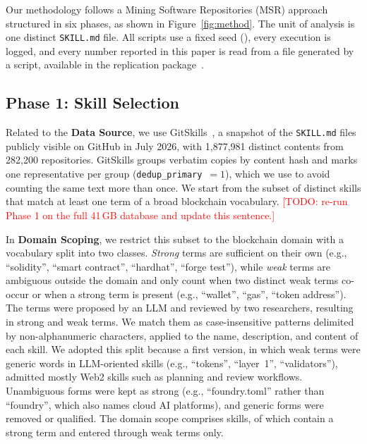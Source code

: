 \documentclass[10pt,conference]{IEEEtran}
\newcommand{\todo}[1]{\textcolor{red}{[TODO: #1]}}
\begin{document}
Our methodology follows a Mining Software Repositories (MSR) approach structured in six phases, as shown in Figure~\ref{fig:method}. The unit of analysis is one distinct \texttt{SKILL.md} file. All scripts use a fixed seed (\Seed), every execution is logged, and every number reported in this paper is read from a file generated by a script, available in the replication package~\cite{replication}.



\subsection{Phase 1: Skill Selection}
\label{sec:selection}

Related to the \textbf{Data Source}, we use GitSkills~\cite{gitskills2027}, a snapshot of the \texttt{SKILL.md} files publicly visible on GitHub in July 2026, with 1,877,981 distinct contents from 282,200 repositories. GitSkills groups verbatim copies by content hash and marks one representative per group (\texttt{dedup\_primary}~$=1$), which we use to avoid counting the same text more than once. We start from the subset of \NScanned distinct skills that match at least one term of a broad blockchain vocabulary. \todo{re-run Phase 1 on the full 41\,GB database and update this sentence.}

In \textbf{Domain Scoping}, we restrict this subset to the blockchain domain with a vocabulary split into two classes. \textit{Strong} terms are sufficient on their own (e.g., ``solidity'', ``smart contract'', ``hardhat'', ``forge test''), while \textit{weak} terms are ambiguous outside the domain and only count when two distinct weak terms co-occur or when a strong term is present (e.g., ``wallet'', ``gas'', ``token address''). The terms were proposed by an LLM and reviewed by two researchers, resulting in \NStrongTerms strong and \NWeakTerms weak terms. We match them as case-insensitive patterns delimited by non-alphanumeric characters, applied to the name, description, and content of each skill. We adopted this split because a first version, in which weak terms were generic words in LLM-oriented skills (e.g., ``tokens'', ``layer~1'', ``validators''), admitted mostly Web2 skills such as planning and review workflows. Unambiguous forms were kept as strong (e.g., ``foundry.toml'' rather than ``foundry'', which also names cloud AI platforms), and generic forms were removed or qualified. The domain scope comprises \NDomain skills, of which \NDomainStrong contain a strong term and \NDomainWeak entered through weak terms only.
\end{document}
